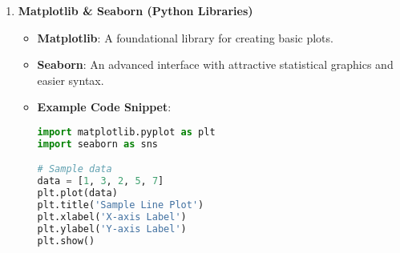 \documentclass{beamer}
\begin{document}
\begin{frame}[fragile]
\begin{enumerate}
        \item \textbf{Matplotlib \& Seaborn (Python Libraries)}
            \begin{itemize}
                \item \textbf{Matplotlib}: A foundational library for creating basic plots.
                \item \textbf{Seaborn}: An advanced interface with attractive statistical graphics and easier syntax.
                \item \textbf{Example Code Snippet}:
                \begin{lstlisting}[language=Python]
import matplotlib.pyplot as plt
import seaborn as sns

# Sample data
data = [1, 3, 2, 5, 7]
plt.plot(data)
plt.title('Sample Line Plot')
plt.xlabel('X-axis Label')
plt.ylabel('Y-axis Label')
plt.show()
                \end{lstlisting}
            \end{itemize}
    \end{enumerate}
\end{frame}
\end{document}
